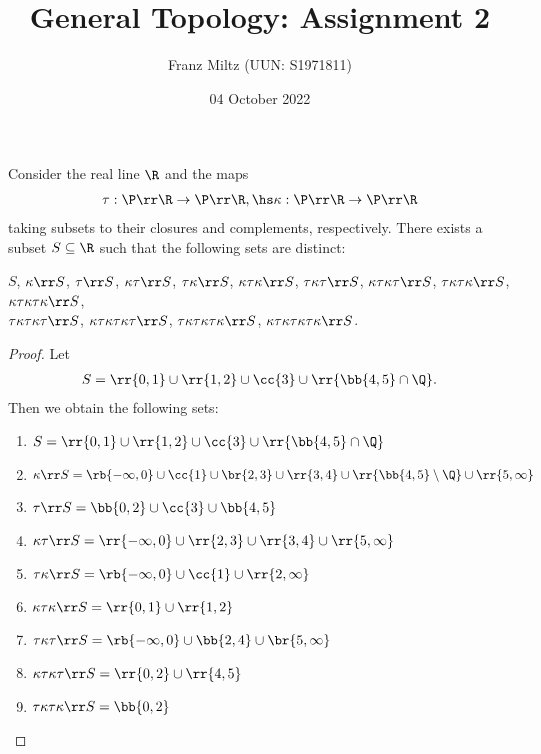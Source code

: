 \documentclass{article}
\begin{document}
\title{General Topology: Assignment 2}
\author{Franz Miltz (UUN: S1971811)}
\date{04 October 2022}
\maketitle

\begin{claim*}[1]
  Consider the real line $\R$ and the maps
  \begin{align*}
    \tau : \P\rr\R \to \P\rr\R, \hs
    \kappa : \P\rr\R \to \P\rr\R
  \end{align*}
  taking subsets to their closures and complements, respectively.
  There exists a subset $S\subseteq\R$ such that the following sets are distinct:
  \begin{center}
    $S$,
    $\kappa\rr S$,
    $\tau\rr S$,
    $\kappa\tau\rr S$,
    $\tau\kappa\rr S$,
    $\kappa\tau\kappa\rr S$,
    $\tau\kappa\tau\rr S$,
    $\kappa\tau\kappa\tau\rr S$,
    $\tau\kappa\tau\kappa\rr S$,
    $\kappa\tau\kappa\tau\kappa\rr S$,\\
    $\tau\kappa\tau\kappa\tau\rr S$,
    $\kappa\tau\kappa\tau\kappa\tau\rr S$,
    $\tau\kappa\tau\kappa\tau\kappa\rr S$,
    $\kappa\tau\kappa\tau\kappa\tau\kappa\rr S$.
  \end{center}
  \begin{proof}
    Let \begin{align*}
      S = \rr{0,1} \cup \rr{1,2} \cup \cc{3} \cup \rr{\bb{4,5}\cap\Q}.
    \end{align*}
    Then we obtain the following sets:
    \begin{enumerate}
      \item $S=\rr{0,1} \cup \rr{1,2} \cup \cc{3} \cup \rr{\bb{4,5}\cap\Q}$
      \item $\kappa\rr S=\rb{-\infty,0}\cup\cc{1}\cup\br{2,3}\cup\rr{3,4}\cup\rr{\bb{4,5}\setminus\Q}\cup\rr{5,\infty}$
      \item $\tau\rr S=\bb{0,2}\cup\cc{3}\cup\bb{4,5}$
      \item $\kappa\tau\rr S=\rr{-\infty,0}\cup\rr{2,3}\cup\rr{3,4}\cup\rr{5,\infty}$
      \item $\tau\kappa\rr S=\rb{-\infty,0}\cup\cc{1}\cup\rr{2,\infty}$
      \item $\kappa\tau\kappa\rr S=\rr{0,1}\cup\rr{1,2}$
      \item $\tau\kappa\tau\rr S=\rb{-\infty,0}\cup\bb{2,4}\cup\br{5,\infty}$
      \item $\kappa\tau\kappa\tau\rr S=\rr{0,2}\cup\rr{4,5}$
      \item $\tau\kappa\tau\kappa\rr S=\bb{0,2}$

\end{enumerate}
\end{proof}
\end{claim*}
\end{document}
